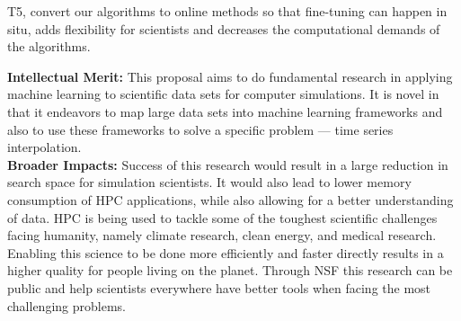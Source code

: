 \documentclass[12pt]{article}
\begin{document}
T5, convert our algorithms to online methods so
that fine-tuning can happen in situ, adds flexibility for scientists
and decreases the computational demands of the algorithms. 


\textbf{Intellectual Merit:} This proposal aims to do fundamental research in
applying machine learning to scientific data sets for computer simulations. It
is novel in that it endeavors to map large data sets 
into machine learning frameworks and also to use these frameworks to solve a
specific problem --- time series interpolation. 
%
\\\textbf{Broader Impacts:} Success of this research would result in a large
reduction in search space for simulation scientists. It would also lead to lower 
memory consumption of HPC applications, while also allowing for a
better understanding of data. HPC is being used to tackle some of the toughest
scientific challenges facing humanity, namely climate research, clean energy,
and medical research. Enabling this science to be done more efficiently and
faster directly results in a higher quality for people living on the planet.
Through NSF this research can be public and help scientists everywhere have
better tools when facing the most challenging problems.


\scriptsize


%
%
\end{document}
